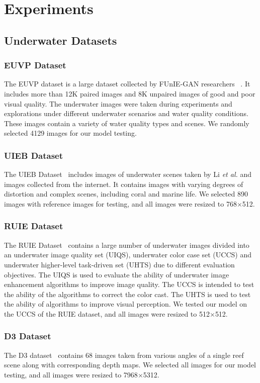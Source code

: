 \documentclass[utf8]{FrontiersinHarvard} %
\begin{document}
\section{Experiments}
\subsection{Underwater Datasets}
\subsubsection{EUVP Dataset}
The EUVP dataset is a large dataset collected by FUnIE-GAN researchers
~\citep{9001231}. It includes more than 12K paired images and 8K unpaired images of good and poor visual quality. The underwater images were taken during experiments and explorations under different underwater scenarios and water quality conditions. These images contain a variety of water quality types and scenes. We randomly selected 4129 images for our model testing.
\subsubsection{UIEB Dataset}
The UIEB Dataset~\citep{8917818} includes images of underwater scenes taken by Li \textit{et al.} and images collected from the internet. It contains images with varying degrees of distortion and complex scenes, including coral and marine life. We selected 890 images with reference images for testing, and all images were resized to 768$\times$512.
\subsubsection{RUIE Dataset}
The RUIE Dataset~\citep{8949763} contains a large number of underwater images divided into an underwater image quality set (UIQS), underwater color case set (UCCS) and underwater higher-level task-driven set (UHTS) due to different evaluation objectives. The UIQS is used to evaluate the ability of underwater image enhancement algorithms to improve image quality. The UCCS is intended to test the ability of the algorithms to correct the color cast. The UHTS is used to test the ability of algorithms to improve visual perception. We tested our model on the UCCS of the RUIE dataset, and all images were resized to 512$\times$512.

\subsubsection{D3 Dataset}
{The D3 dataset~\citep{akkaynak2019sea} contains 68 images taken from various angles of a single reef scene along with corresponding depth maps. We selected all images for our model testing, and all images were resized to 7968$\times$5312.}
\end{document}
